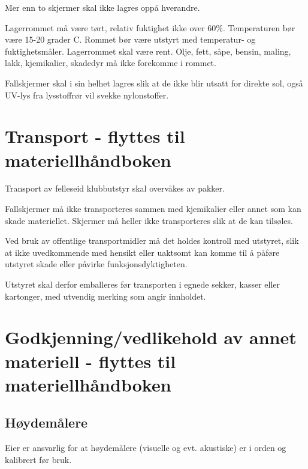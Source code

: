 Mer enn to skjermer skal ikke lagres oppå hverandre.

Lagerrommet må være tørt, relativ fuktighet ikke over 60\%. Temperaturen bør være 15-20 grader C. Rommet bør være utstyrt med temperatur- og fuktighetsmåler. Lagerrommet skal være rent. Olje, fett, såpe, bensin, maling, lakk, kjemikalier, skadedyr må ikke forekomme i rommet.

Fallskjermer skal i sin helhet lagres slik at de ikke blir utsatt for direkte sol, også UV-lys fra lysstoffrør vil svekke nylonstoffer.

\section[Transport]{Transport - flyttes til materiellhåndboken}
Transport av felleseid klubbutstyr skal overvåkes av pakker.

Fallskjermer må ikke transporteres sammen med kjemikalier eller annet som kan skade materiellet. Skjermer må heller ikke transporteres slik at de kan tilsøles.

Ved bruk av offentlige transportmidler må det holdes kontroll med utstyret, slik at ikke uvedkommende med hensikt eller uaktsomt kan komme til å påføre utstyret skade eller påvirke funksjonsdyktigheten.

Utstyret skal derfor emballeres før transporten i egnede sekker, kasser eller kartonger, med utvendig merking som angir innholdet.

\section[Godkjenning/vedlikehold av annet materiell]{Godkjenning/vedlikehold av annet materiell - flyttes til materiellhåndboken}
\subsection{Høydemålere}
Eier er ansvarlig for at høydemålere (visuelle og evt. akustiske) er i orden og kalibrert før bruk.

